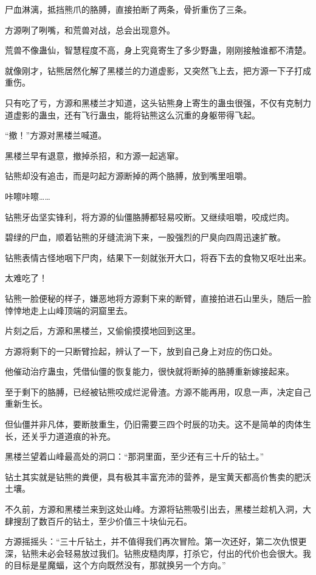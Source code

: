 \begin{this_body}
尸血淋漓，抵挡熊爪的胳膊，直接拍断了两条，骨折重伤了三条。

方源咧了咧嘴，和荒兽对战，总会出现意外。

荒兽不像蛊仙，智慧程度不高，身上究竟寄生了多少野蛊，刚刚接触谁都不清楚。

就像刚才，钻熊居然化解了黑楼兰的力道虚影，又突然飞上去，把方源一下子打成重伤。

只有吃了亏，方源和黑楼兰才知道，这头钻熊身上寄生的蛊虫很强，不仅有克制力道虚影的蛊虫，还有飞行蛊虫，能将钻熊这么沉重的身躯带得飞起。

“撤！”方源对黑楼兰喊道。

黑楼兰早有退意，撤掉杀招，和方源一起逃窜。

钻熊却没有追击，而是叼起方源断掉的两个胳膊，放到嘴里咀嚼。

咔嚓咔嚓……

钻熊牙齿坚实锋利，将方源的仙僵胳膊都轻易咬断。又继续咀嚼，咬成烂肉。

碧绿的尸血，顺着钻熊的牙缝流淌下来，一股强烈的尸臭向四周迅速扩散。

钻熊表情古怪地咽下尸肉，结果下一刻就张开大口，将吞下去的食物又呕吐出来。

太难吃了！

钻熊一脸便秘的样子，嫌恶地将方源剩下来的断臂，直接拍进石山里头，随后一脸悻悻地走上山峰顶端的洞窟里去。

片刻之后，方源和黑楼兰，又偷偷摸摸地回到这里。

方源将剩下的一只断臂捡起，辨认了一下，放到自己身上对应的伤口处。

他催动治疗蛊虫，凭借仙僵的恢复能力，很快就将断掉的胳膊重新嫁接起来。

至于剩下的胳膊，已经被钻熊咬成烂泥骨渣。方源不能再用，叹息一声，决定自己重新生长。

但仙僵并非凡体，要断肢重生，仍旧需要三四个时辰的功夫。这不是简单的肉体生长，还关乎力道道痕的补充。

黑楼兰望着山峰最高处的洞口：“那洞里面，至少还有三十斤的钻土。”

钻土其实就是钻熊的粪便，具有极其丰富充沛的营养，是宝黄天都高价售卖的肥沃土壤。

不久前，方源和黑楼兰来到这处山峰。方源将钻熊吸引出去，黑楼兰趁机入洞，大肆搜刮了数百斤的钻土，至少价值三十块仙元石。

方源摇摇头：“三十斤钻土，并不值得我们再次冒险。第一次还好，第二次仇恨更深，钻熊未必会轻易放过我们。钻熊皮糙肉厚，打杀它，付出的代价也会很大。我的目标是星魔蝠，这个方向既然没有，那就换另一个方向。”

\end{this_body}

